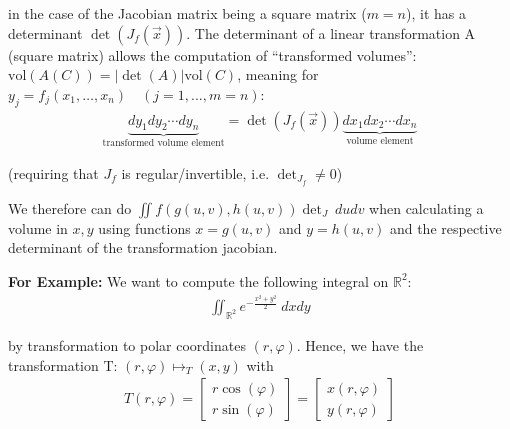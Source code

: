in the case of the Jacobian matrix being a square matrix ($m=n$), it has a determinant $\det(J_f(\vec{x}))$.
The determinant of a linear transformation A (square matrix) allows the computation of ``transformed volumes'':
$\mathrm{vol}(A(C))=|\det(A)|\mathrm{vol}(C)$, meaning for $y_j = f_j(x_1,\ldots,x_n)\quad(j=1,...,m=n)$:
\begin{align*}
    \underbrace{dy_1dy_2\cdots dy_n}_\text{transformed volume element} = \det(J_f(\vec{x}))
    \underbrace{dx_1dx_2\cdots dx_n}_\text{volume element}
\end{align*}

(requiring that $J_f$ is regular/invertible, i.e. $\det_{J_f}\neq0$)


We therefore can do $\iint f(g(u,v), h(u,v))\det_J\ dudv$ when calculating a volume in $x,y$ using functions
$x=g(u,v)$ and $y=h(u,v)$ and the respective determinant of the transformation jacobian.

\textbf{For Example:} We want to compute the following integral on $\mathbb{R}^2$:
\begin{align*}
	\iint_{\mathbb{R}^2}e^{-\frac{x^2+y^2}{2}}\ dxdy
\end{align*}

by transformation to polar coordinates $(r,\varphi)$.
Hence, we have the transformation T: $(r,\varphi) \mapsto_T (x,y)$ with
\begin{align*}
	T(r,\varphi) = \begin{bmatrix}
		r\cos(\varphi) \\
		r\sin(\varphi)
	\end{bmatrix}
	=
	\begin{bmatrix}
		x(r, \varphi) \\
		y(r, \varphi)
	\end{bmatrix}
\end{align*}

